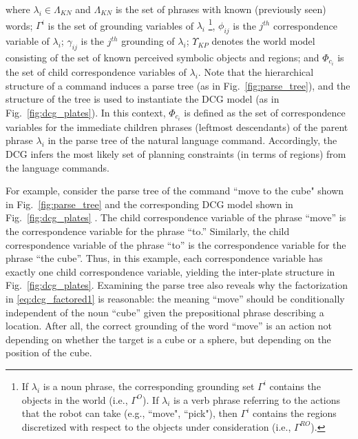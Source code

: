 where $\lambda_i \in \Lambda_{KN}$ and $\Lambda_{KN}$ is the set of phrases with known (previously seen) words; $\Gamma^i$ is the set of grounding variables of $\lambda_i$ \footnote{If $\lambda_i$ is a noun phrase, the corresponding grounding set $\Gamma^i$ contains the objects in the world (i.e., $\Gamma^O$). If $\lambda_i$ is a verb phrase referring to the actions that the robot can take (e.g., ``move", ``pick"), then $\Gamma^i$ contains the regions discretized with respect to the objects under consideration (i.e., $\Gamma^{RO}$).}, $\phi_{ij}$ is the $j^{th}$ correspondence variable of $\lambda_i$; $\gamma_{ij}$ is the $j^{th}$ grounding of $\lambda_i$; $\Upsilon_{KP}$ denotes the world model consisting of the set of known perceived symbolic objects and regions; and  $\Phi_{c_{i}}$ is the set of child correspondence variables of $\lambda_{i}$. Note that the hierarchical structure of a command induces a parse tree (as in Fig.~\ref{fig:parse_tree}), and the structure of the tree is used to instantiate the DCG model (as in Fig.~\ref{fig:dcg_plates}). In this context, $\Phi_{c_{i}}$ is defined as the set of correspondence variables for the immediate children phrases (leftmost descendants) of the parent phrase $\lambda_i$ in the parse tree of the natural language command. Accordingly, the DCG infers the most likely set of planning constraints (in terms of regions) from the language commands.

For example, consider the parse tree of the command ``move to the cube" shown in Fig.~\ref{fig:parse_tree} and the corresponding DCG model shown in Fig.~\ref{fig:dcg_plates} . The child correspondence variable of the phrase ``move'' is the correspondence variable for the phrase ``to.'' Similarly, the child correspondence variable of the phrase ``to'' is the correspondence variable for the phrase ``the cube''. Thus, in this example, each correspondence variable has exactly one child correspondence variable, yielding the inter-plate structure in Fig.~\ref{fig:dcg_plates}.
Examining the parse tree also reveals why the factorization in \eqref{eq:dcg_factored1} is reasonable: the meaning ``move'' should be conditionally independent of the noun ``cube'' given the prepositional phrase describing a location.
After all, the correct grounding of the word ``move'' is an action not depending on whether the target is a cube or a sphere, but depending on the position of the cube.

